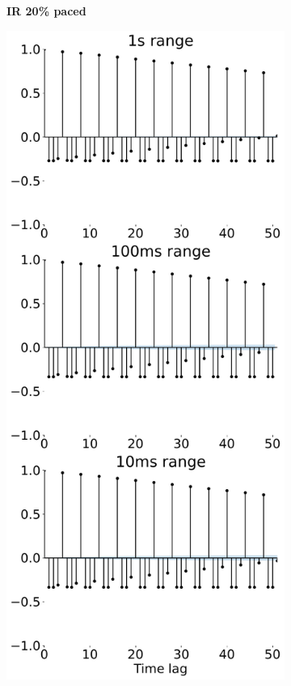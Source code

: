 \begin{figure}[t]
\begin{subfigure}[t]{.24\linewidth}
		\caption{\textbf{IR 20\% paced}}
		\label{fig:app-pacing-autocorr-rack-20}
	\end{subfigure}
     \begin{subfigure}[t]{.24\linewidth}
		\centering\includegraphics[width=1\linewidth]{figs/intra_rack_autocor_60.pdf}

\end{subfigure}
\end{figure}
